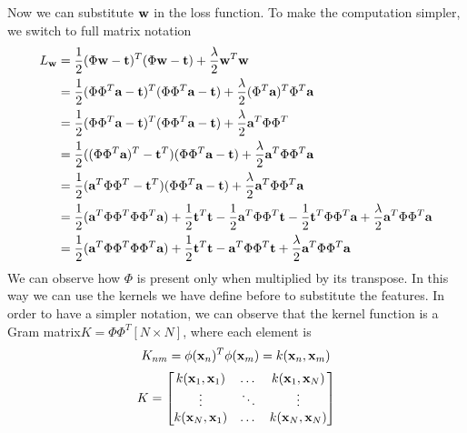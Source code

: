 \documentclass[main.tex]{subfiles}
\begin{document}
Now we can substitute $\textbf{w}$ in the loss function. To make the computation simpler, we switch to full matrix notation
\begin{align*}
    L_{\textbf{w}} &= \frac{1}{2}(\Phi \textbf{w} - \textbf{t})^T(\Phi \textbf{w} - \textbf{t})+\frac{\lambda}{2}\textbf{w}^T \textbf{w} \\
    &= \frac{1}{2}(\Phi \Phi^T \textbf{a} - \textbf{t})^T(\Phi \Phi^T \textbf{a} - \textbf{t})+\frac{\lambda}{2}(\Phi^T \textbf{a})^T \Phi^T \textbf{a} \\
    &= \frac{1}{2}(\Phi \Phi^T \textbf{a} - \textbf{t})^T(\Phi \Phi^T \textbf{a} - \textbf{t})+\frac{\lambda}{2} \textbf{a}^T \Phi \Phi^T \textbf{} \\
    &= \frac{1}{2}((\Phi \Phi^T \textbf{a})^T - \textbf{t}^T)(\Phi \Phi^T \textbf{a} - \textbf{t})+\frac{\lambda}{2} \textbf{a}^T \Phi \Phi^T \textbf{a} \\
    &= \frac{1}{2}(\textbf{a}^T \Phi \Phi^T - \textbf{t}^T)(\Phi \Phi^T \textbf{a} - \textbf{t})+\frac{\lambda}{2} \textbf{a}^T \Phi \Phi^T \textbf{a} \\
    &= \frac{1}{2}(\textbf{a}^T \Phi \Phi^T \Phi \Phi^T \textbf{a}) + \frac{1}{2}\textbf{t}^T \textbf{t} -\frac{1}{2} \textbf{a}^T \Phi \Phi^T \textbf{t} -\frac{1}{2} \textbf{t}^T \Phi \Phi^T \textbf{a} +\frac{\lambda}{2} \textbf{a}^T \Phi \Phi^T \textbf{a} \\
    &= \frac{1}{2}(\textbf{a}^T \Phi \Phi^T \Phi \Phi^T \textbf{a}) + \frac{1}{2}\textbf{t}^T \textbf{t} - \textbf{a}^T \Phi \Phi^T \textbf{t} +\frac{\lambda}{2} \textbf{a}^T \Phi \Phi^T \textbf{a}
\end{align*}
We can observe how $\Phi$ is present only when multiplied by its transpose. In this way we can use the kernels we have define before to substitute the features. In order to have a simpler notation, we can observe that the kernel function is a Gram matrix\footnotemark $K=\Phi\Phi^T [N \times N]$, where each element is 
\begin{equation*}
    K_{nm} = \phi(\textbf{x}_n)^T \phi(\textbf{x}_m) = k(\textbf{x}_n,\textbf{x}_m)
\end{equation*}
\begin{equation}
    K =
    \begin{bmatrix}
    k(\textbf{x}_1,\textbf{x}_1) & \dots & k(\textbf{x}_1,\textbf{x}_N) \\ 
    \vdots & \ddots & \vdots \\
    k(\textbf{x}_N,\textbf{x}_1) & \dots & k(\textbf{x}_N,\textbf{x}_N)
    \end{bmatrix}
\end{equation}
\end{document}
